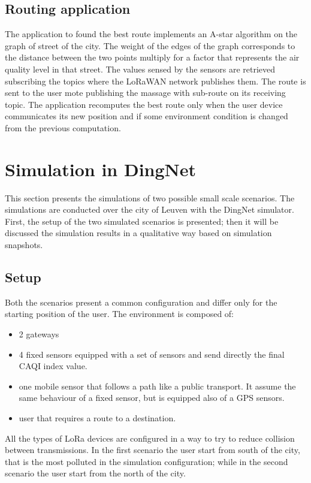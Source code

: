 \subsection*{Routing application}
The application to found the best route implements an A-star algorithm on the graph of street of the city. 
The weight of the edges of the graph corresponds to the distance between the two points multiply for a factor that represents the air quality level in that street. 
The values sensed by the sensors are retrieved subscribing the topics where the LoRaWAN network publishes them. 
The route is sent to the user mote publishing the massage with sub-route on its receiving topic.
The application recomputes the best route only when the user device communicates its new position and if some environment condition is changed from the previous computation.

\section{Simulation in DingNet}

This section presents the simulations of two possible small scale scenarios. 
The simulations are conducted over the city of Leuven with the DingNet simulator.
First, the setup of the two simulated scenarios is presented; then it will be discussed the simulation results in a qualitative way based on simulation snapshots.

\subsection{Setup}
Both the scenarios present a common configuration and differ only for the starting position of the user.
The environment is composed of:
\begin{itemize}
    \item 2 gateways
    \item 4 fixed sensors equipped with a set of sensors and send directly the final CAQI index value.
    \item one mobile sensor that follows a path like a public transport. It assume the same behaviour of a fixed sensor, but is equipped also of a GPS sensors.
    \item user that requires a route to a destination.
\end{itemize} 
All the types of LoRa devices are configured in a way to try to reduce collision between transmissions.
In the first scenario the user start from south of the city, that is the most polluted in the simulation configuration; while in the second scenario the user start from the north of the city.

